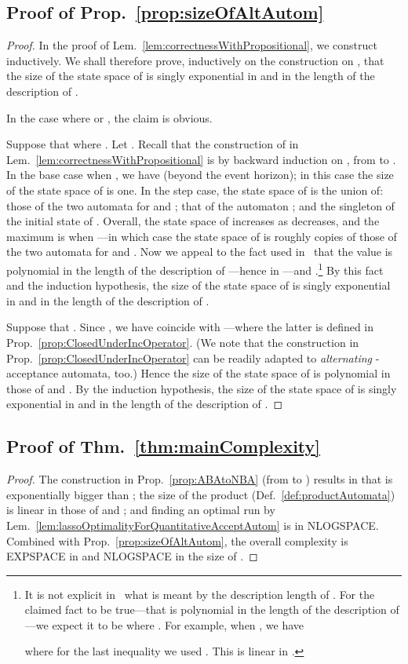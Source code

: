 \documentclass[a4paper,USenglish,numberwithinsect]{lipics}
\theoremstyle{definition}
\theoremstyle{remark}
\theoremstyle{plain}
\begin{document}
\subsection{Proof of Prop.~\ref{prop:sizeOfAltAutom}}
\label{pf:propsizeOfAltAutom}
\begin{proof}
  In the proof of Lem.~\ref{lem:correctnessWithPropositional}, we construct  inductively.
 We shall therefore prove, inductively on the construction on , that the size of the state space of  is singly exponential in  and in the length of the description of .
 
 In the case where  or
 , the claim is obvious.
 
 Suppose that  where . Let . Recall that
 the construction of 
  in
 Lem.~\ref{lem:correctnessWithPropositional}
 is by backward induction on , from  to . 
 In the base case when ,  we have
  (beyond the event
 horizon);  in this case
 the size of the state space of  is
 one. In the step case, the state space of
  is the union of: 
 those of the two automata for  and ;
 that of the automaton ; and 
 the singleton of the initial state of
 . 
 Overall, the state space of
  increases as  decreases, and the
 maximum is when ---in which case the state space of
  is roughly 
 copies of
those of the two automata for  and . 
Now we appeal to the fact used in~\cite{AlmagorBK14} that the value
  is
 polynomial in the length of the description of ---hence in 
---and
 .\footnote{It is not explicit in~\cite{AlmagorBK14} what
 is meant by the description length of . For the claimed
 fact to be true---that
  is
 polynomial in the length of the description of ---we expect it to be  where .
 For example, when ,  we have
 
  where for the last inequality we used . 
  This is linear in .
 }
 By this fact and the induction hypothesis, the size of the state space of  is singly exponential in  and in the length of the description of .
 
 Suppose that . Since
 ,
 we have  coincide with
 ---where the latter is defined
 in Prop.~\ref{prop:ClosedUnderIncOperator}. (We note that the
 construction  in Prop.~\ref{prop:ClosedUnderIncOperator} can be readily
 adapted to
\emph{alternating} -acceptance automata, too.) Hence the size of the state space of  is polynomial in those of  and . By the induction hypothesis, the size of the state space of  is singly exponential in  and in the length of the description of .
\end{proof}


\subsection{Proof of Thm.~\ref{thm:mainComplexity}}
\begin{proof}
 The construction in Prop.~\ref{prop:ABAtoNBA} (from  to
 ) results in 
 that is exponentially bigger than ; the size of 
 the product 
 (Def.~\ref{def:productAutomata}) is linear in those of
  and ; and finding
 an optimal run by
 Lem.~\ref{lem:lassoOptimalityForQuantitativeAcceptAutom} is in
 NLOGSPACE. Combined with Prop.~\ref{prop:sizeOfAltAutom}, the overall
 complexity is EXPSPACE in  and NLOGSPACE in the size of .
\end{proof}
\end{document}
